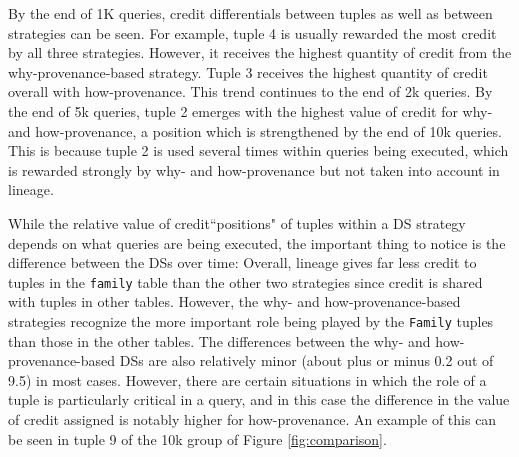 By the end of 1K queries, credit differentials between tuples as well as between strategies can be seen.  For example, \textcolor{correction}{tuple 4 is usually rewarded the most credit by all three strategies. However, it receives the highest quantity of credit from the why-provenance-based strategy. Tuple 3 receives the highest quantity of credit overall with how-provenance.}
This trend continues to the end of 2k queries.
By the end of 5k queries, tuple 2 emerges with the highest value of credit for why- and how-provenance, a position which is strengthened by the end of 10k queries. This is because tuple 2 is used several times within queries being executed, which is rewarded strongly by why- and how-provenance but not taken into account in lineage.

While the relative value of credit``positions" of tuples within a DS strategy depends on what queries are being executed, the important thing to notice is the difference between the DSs over time:  Overall, lineage gives far less credit to tuples in the \texttt{family} table than the other two strategies since credit is  shared with tuples in other tables.
However, the why- and how-provenance-based strategies recognize the more important role being played by the \texttt{Family} tuples than those in the other tables.
The differences between the why- and how-provenance-based DSs are also relatively minor (about plus or minus 0.2 out of 9.5) in most cases. However, there are certain situations in which the role of a tuple is particularly critical in a query, and in this case the difference in the value of credit assigned is notably higher for how-provenance.  An example of this can be seen in tuple 9 of the 10k group of Figure \ref{fig:comparison}. 



